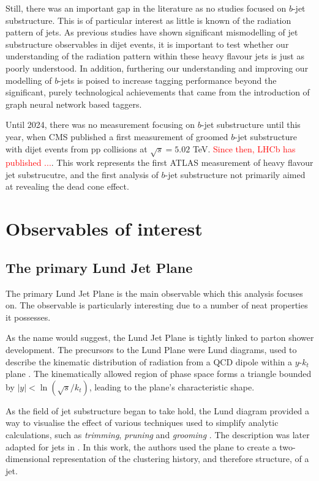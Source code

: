 \documentclass[10pt,a4paper]{book}
\newcommand{\todo}[1]{{\textcolor{red}{#1}}}
\begin{document}
Still, there was an important gap in the literature as no studies focused on $b$-jet substructure. This is of particular interest as little is known of the radiation pattern of jets. As previous studies have shown significant mismodelling of jet substructure observables in dijet events, it is important to test whether our understanding of the radiation pattern within these heavy flavour jets is just as poorly understood. In addition, furthering our understanding and improving our modelling of $b$-jets is poised to increase tagging performance beyond the significant, purely technological achievements that came from the introduction of graph neural network based taggers. 

Until 2024, there was no measurement focusing on $b$-jet substructure until this year, when CMS published a first measurement of groomed $b$-jet substructure with dijet events from pp collisions at $\sqrt{s} = 5.02$ TeV. \todo{Since then, LHCb has published ...}. 
This work represents the first ATLAS measurement of heavy flavour jet substrucutre, and the first analysis of $b$-jet substructure not primarily aimed at revealing the dead cone effect.

\section{Observables of interest}

\subsection{The primary Lund Jet Plane}
\label{lp}

The primary Lund Jet Plane is the main observable which this analysis focuses on. The observable is particularly interesting due to a number of neat properties it possesses. 

As the name would suggest, the Lund Jet Plane is tightly linked to parton shower development. The precursors to the Lund Plane were Lund diagrams, used to describe the kinematic distribution of radiation from a QCD dipole within a $y$-$k_t$ plane \cite{andersson1989coherence}. The kinematically allowed region of phase space forms a triangle bounded by $\vert y \vert < \ln(\sqrt{s}/k_t)$, leading to the plane's characteristic shape. 

As the field of jet substructure began to take hold, the Lund diagram provided a way to visualise the effect of various techniques used to simplify analytic calculations, such as \emph{trimming}, \emph{pruning} and \emph{grooming} \cite{Dasgupta:2013ihk, Larkoski:2014wba}. The description was later adapted for jets in \cite{Dreyer:2018nbf}. In  this work, the authors used the plane to create a two-dimensional representation of the clustering history, and therefore structure, of a jet.
\end{document}
